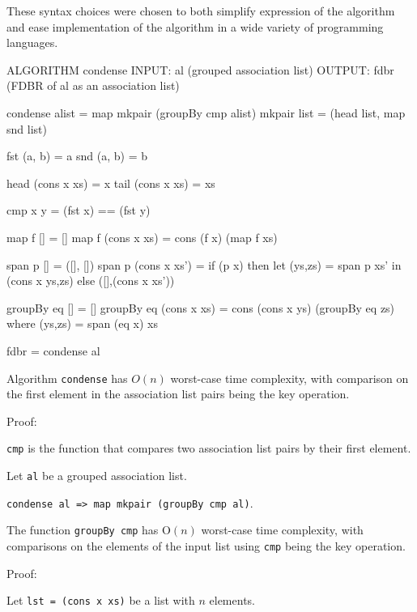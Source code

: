 \documentclass[../main.tex]{subfiles}
\begin{document}
These syntax choices were chosen to both simplify expression of the algorithm and ease implementation of the algorithm in a wide variety of programming languages.

\begin{code}

ALGORITHM condense
INPUT: al (grouped association list)
OUTPUT: fdbr (FDBR of al as an association list)

condense alist = map mkpair (groupBy cmp alist)
mkpair list = (head list, map snd list)

fst (a, b) = a
snd (a, b) = b

head (cons x xs) = x
tail (cons x xs) = xs

cmp x y = (fst x) == (fst y)

map f [] = []
map f (cons x xs) = cons (f x) (map f xs)

span p [] =  ([], [])
span p (cons x xs')
 = if (p x)
   then let (ys,zs) = span p xs' in (cons x ys,zs)
   else ([],(cons x xs'))

groupBy eq []          = []
groupBy eq (cons x xs) = cons (cons x ys) (groupBy eq zs)
where (ys,zs) = span (eq x) xs

fdbr = condense al

\end{code}

\begin{theorem}
	Algorithm \texttt{condense} has $O(n)$ worst-case time complexity, with comparison on the first element in the association list pairs being the key operation.
\end{theorem}

Proof:

\texttt{cmp} is the function that compares two association list pairs by their first element.  

Let \texttt{al} be a grouped association list.

\texttt{condense al => map mkpair (groupBy cmp al)}.

\begin{proposition}
	The function \texttt{groupBy cmp} has O$(n)$ worst-case time complexity, with comparisons on the elements of the input list using \texttt{cmp} being the key operation.
\end{proposition}

Proof:

Let \texttt{lst = (cons x xs)} be a list with $n$ elements.
\end{document}
